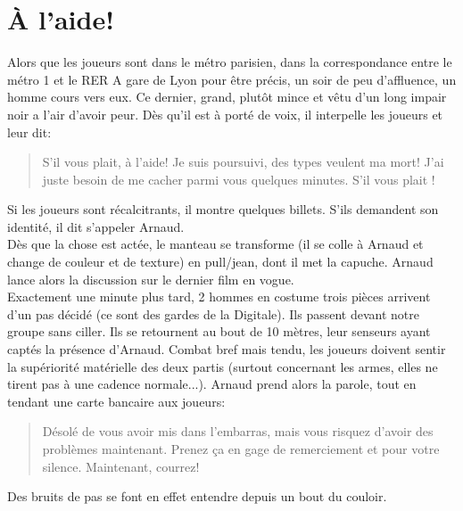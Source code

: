\documentclass[10pt,a4paper,twocolumn]{article}
\begin{document}
\section{À l'aide!}
Alors que les joueurs sont dans le métro parisien, dans la correspondance entre le métro 1 et le RER A gare de Lyon pour être précis, un soir de peu d'affluence, un homme cours vers eux. Ce  dernier, grand, plutôt mince et vêtu d'un long impair noir a l'air d'avoir peur. Dès qu'il est à porté de voix, il interpelle les joueurs et leur dit:
\begin{quote}
S'il vous plait, à l'aide! Je suis poursuivi, des types veulent ma mort! J'ai juste besoin de me cacher parmi vous quelques minutes. S'il vous plait !
\end{quote}
Si les joueurs sont récalcitrants, il montre quelques billets. S'ils demandent son identité, il dit s'appeler Arnaud.
\\
Dès que la chose est actée, le manteau se transforme (il se colle à Arnaud et change de couleur et de texture) en pull/jean, dont il met la capuche. Arnaud lance alors la discussion sur le dernier film en vogue.\\
Exactement une minute plus tard, 2 hommes en costume trois pièces arrivent d'un pas décidé (ce sont des gardes de la Digitale). Ils passent devant notre groupe sans ciller. Ils se retournent au bout de 10 mètres, leur senseurs ayant captés la présence d'Arnaud. Combat bref mais tendu, les joueurs doivent sentir la supériorité matérielle des deux partis (surtout concernant les armes, elles ne tirent pas à une cadence normale...). Arnaud prend alors la parole, tout en tendant une carte bancaire aux joueurs:
\begin{quote}
Désolé de vous avoir mis dans l'embarras, mais vous risquez d'avoir des problèmes maintenant. Prenez ça en gage de remerciement et pour votre silence. Maintenant, courrez!
\end{quote}
Des bruits de pas se font en effet entendre depuis un bout du couloir.
\end{document}
